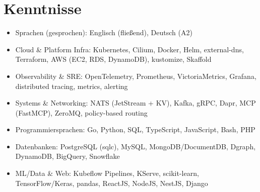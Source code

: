 \documentclass[10pt,a4paper]{resume}
\begin{document}
\section{Kenntnisse}

\begin{itemize}[leftmargin=1.4em,nosep,topsep=2pt]
  \item Sprachen (gesprochen): Englisch (fließend), Deutsch (A2)
  \item Cloud \& Platform Infra: Kubernetes, Cilium, Docker, Helm, external-dns, Terraform, AWS (EC2, RDS, DynamoDB), kustomize, Skaffold
  \item Observability \& SRE: OpenTelemetry, Prometheus, VictoriaMetrics, Grafana, distributed tracing, metrics, alerting
  \item Systems \& Networking: NATS (JetStream + KV), Kafka, gRPC, Dapr, MCP (FastMCP), ZeroMQ, policy-based routing
  \item Programmiersprachen: Go, Python, SQL, TypeScript, JavaScript, Bash, PHP
  \item Datenbanken: PostgreSQL (sqlc), MySQL, MongoDB/DocumentDB, Dgraph, DynamoDB, BigQuery, Snowflake
  \item ML/Data \& Web: Kubeflow Pipelines, KServe, scikit-learn, TensorFlow/Keras, pandas, ReactJS, NodeJS, NestJS, Django
\end{itemize}
\end{document}
